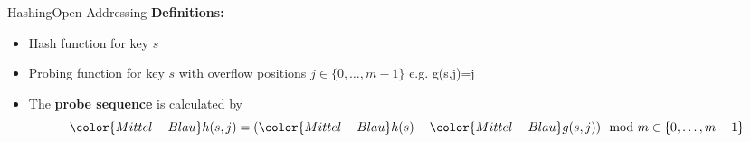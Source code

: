 \begin{frame}{Hashing}{Open Addressing}
  \textbf{Definitions:}
  \begin{itemize}
    \item<2->[\color{Mittel-Blau}$h(s)$]
      Hash function for key {\color{Mittel-Blau}$s$}
    \item<3->[\color{Mittel-Blau}$g(s,j)$]
      Probing function for key {\color{Mittel-Blau}$s$}
      with overflow positions {\color{Mittel-Blau}$j \in \{0,\dots,m-1\}$}
      e.g. {\color{Mittel-Blau}g(s,j)=j}
    \item<4->
      The \textbf{probe sequence } is calculated by
      \begin{displaymath}
        {\color{Mittel-Blau}h(s,j)}
        = ({\color{Mittel-Blau}h(s)} - {\color{Mittel-Blau}g(s,j)})
        \mod m \in \{0,\dots,m-1\}
      \end{displaymath}
  \end{itemize}
\begin{adjustbox}{width=0.75\linewidth}%
     \end{adjustbox}
\end{frame}




